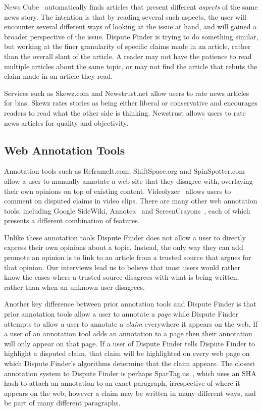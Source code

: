 \documentclass{www2010-submission}
\begin{document}
News Cube~\cite{Park2009} automatically finds articles that present different {\it aspects} of the same news story. The intention is that by reading several such aspects, the user will encounter several different ways of looking at the issue at hand, and will gained a broader perspective of the issue. Dispute Finder is trying to do something similar, but working at the finer granularity of specific claims made in an article, rather than the overall slant of the article. A reader may not have the patience to read multiple articles about the same topic, or may not find the article that rebuts the claim made in an article they read. 

Services such as Skewz.com and Newstrust.net allow users to rate news articles for bias. Skewz rates stories as being either liberal or conservative and encourages readers to read what the other side is thinking. Newstrust allows users to rate news articles for quality and objectivity. 


\subsection{Web Annotation Tools}

Annotation tools such as ReframeIt.com, ShiftSpace.org and SpinSpotter.com allow a user to manually annotate a web site that they disagree with, overlaying their own opinions on top of existing content. Videolyzer~\cite{Diakopoulos2008} allows users to comment on disputed claims in video clips. There are many other web annotation tools, including Google SideWiki, Annotea~\cite{Koivunen2001} and ScreenCrayons~\cite{Olsen2004}, each of which presents a different combination of features.

Unlike these annotation tools Dispute Finder does not allow a user to directly express their own opinions about a topic. Instead, the only way they can add promote an opinion is to link to an article from a trusted source that argues for that opinion. Our interviews lead us to believe that most users would rather know the cases where a trusted source disagrees with what is being written, rather than when an unknown user disagrees.

Another key difference between prior annotation tools and Dispute Finder is that prior annotation tools allow a user to annotate a {\it page} while Dispute Finder attempts to allow a user to annotate a {\it claim} everywhere it appears on the web. If a user of an annotation tool adds an annotation to a page then their annotation will only appear on that page. If a user of Dispute Finder tells Dispute Finder to highlight a disputed claim, that claim will be highlighted on every web page on which Dispute Finder's algorithms determine that the claim appears. The closest annotation system to Dispute Finder is perhaps SparTag.us~\cite{Hong2009}, which uses an SHA hash to attach an annotation to an exact paragraph, irrespective of where it appears on the web; however a claim may be written in many different ways, and be part of many different paragraphs.
\end{document}
